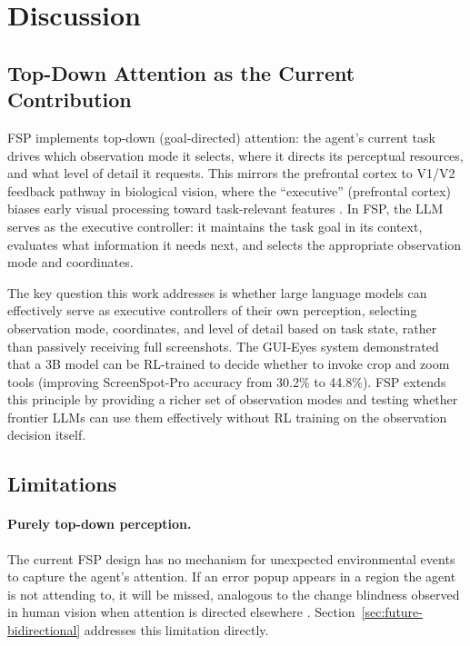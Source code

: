 \documentclass[11pt,a4paper]{article}
\begin{document}
\section{Discussion}
\label{sec:discussion}

\subsection{Top-Down Attention as the Current Contribution}

FSP implements top-down (goal-directed) attention: the agent's current task drives which observation mode it selects, where it directs its perceptual resources, and what level of detail it requests. This mirrors the prefrontal cortex to V1/V2 feedback pathway in biological vision, where the ``executive'' (prefrontal cortex) biases early visual processing toward task-relevant features \cite{desimone-duncan-attention, corbetta2002control}. In FSP, the LLM serves as the executive controller: it maintains the task goal in its context, evaluates what information it needs next, and selects the appropriate observation mode and coordinates.

The key question this work addresses is whether large language models can effectively serve as executive controllers of their own perception, selecting observation mode, coordinates, and level of detail based on task state, rather than passively receiving full screenshots. The GUI-Eyes system \cite{gui-eyes} demonstrated that a 3B model can be RL-trained to decide whether to invoke crop and zoom tools (improving ScreenSpot-Pro accuracy from 30.2\% to 44.8\%). FSP extends this principle by providing a richer set of observation modes and testing whether frontier LLMs can use them effectively without RL training on the observation decision itself.

\subsection{Limitations}

\paragraph{Purely top-down perception.}
The current FSP design has no mechanism for unexpected environmental events to capture the agent's attention. If an error popup appears in a region the agent is not attending to, it will be missed, analogous to the change blindness observed in human vision when attention is directed elsewhere \cite{simons2005change}. Section~\ref{sec:future-bidirectional} addresses this limitation directly.
\end{document}
